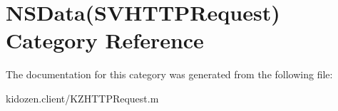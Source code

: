 \hypertarget{category_n_s_data_07_s_v_h_t_t_p_request_08}{\section{N\-S\-Data(S\-V\-H\-T\-T\-P\-Request) Category Reference}
\label{category_n_s_data_07_s_v_h_t_t_p_request_08}
}


The documentation for this category was generated from the following file\-:\begin{DoxyCompactItemize}
\item 
kidozen.\-client/K\-Z\-H\-T\-T\-P\-Request.\-m\end{DoxyCompactItemize}
